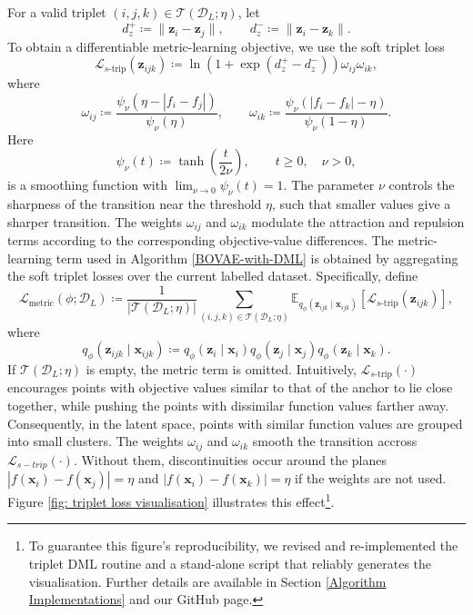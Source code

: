 \documentclass[pdflatex,sn-mathphys-num]{sn-jnl}%
\theoremstyle{thmstyleone}%
\theoremstyle{thmstyletwo}%
\theoremstyle{thmstylethree}%
\begin{document}
For a valid triplet \((i,j,k)\in\mathcal T(\mathcal D_L;\eta)\), let
\[
    d_z^+ \coloneq \|\mathbf z_i- \mathbf z_j\|,
    \qquad
    d_z^- \coloneq \|\mathbf z_i- \mathbf z_k\|.
\]
To obtain a differentiable metric-learning objective, we use the soft triplet loss
\begin{equation}\label{L_s_trip}
        \mathcal L_{s\text{-trip}}(\mathbf z_{ijk})
    \coloneq
    \ln\!\left(1+\exp(d_z^+-d_z^-)\right)\omega_{ij}\omega_{ik},
\end{equation}
where
\[
    \omega_{ij}
    \coloneq
    \frac{\psi_\nu(\eta-|f_i-f_j|)}{\psi_\nu(\eta)},
    \qquad
    \omega_{ik}
    \coloneq
    \frac{\psi_\nu(|f_i-f_k|-\eta)}{\psi_\nu(1-\eta)}.
\]
Here
\[
    \psi_\nu(t)\coloneq\tanh\!\left(\frac{t}{2\nu}\right),
    \qquad t\geq 0,\quad \nu>0,
\]
is a smoothing function with $\lim_{\nu \rightarrow 0} \psi_\nu(t) = 1$. The parameter \(\nu\) controls the sharpness of the transition near the threshold \(\eta\), such that smaller values give a sharper transition. The weights $\omega_{ij}$ and $\omega_{ik}$ modulate the attraction and repulsion terms according to the corresponding objective-value differences.
The metric-learning term used in Algorithm \ref{BOVAE-with-DML} is obtained by aggregating the soft triplet losses over the current labelled dataset. Specifically, define
\begin{equation}\label{metric_loss_avg}
    \mathcal L_{\mathrm{metric}}(\phi;\mathcal D_L)
    \coloneq
    \frac{1}{|\mathcal T(\mathcal D_L;\eta)|}
    \sum_{(i,j,k)\in\mathcal T(\mathcal D_L;\eta)}
    \mathbb E_{q_\phi(\mathbf z_{ijk}\mid \mathbf x_{ijk})}
    \left[
        \mathcal L_{s\text{-trip}}(\mathbf z_{ijk})
    \right],
\end{equation}
where
\[
    q_\phi(\mathbf z_{ijk}\mid \mathbf x_{ijk})
    \coloneq
    q_\phi(\mathbf z_i\mid \mathbf x_i)q_\phi(\mathbf z_j\mid \mathbf x_j)q_\phi(\mathbf z_k\mid \mathbf x_k).
\]
If \(\mathcal T(\mathcal D_L;\eta)\) is empty, the metric term is omitted. Intuitively, $\mathcal{L}_{s\text{-trip}}(\cdot)$ encourages points with objective values similar to that of the anchor to lie close together, while pushing the points with dissimilar function values farther away. Consequently, in the latent space, points with similar function values are grouped into small clusters. The weights $\omega_{ij}$ and $\omega_{ik}$ smooth the transition accross $\mathcal{L}_{s-trip}(\cdot)$. Without them, discontinuities occur around the planes $|f(\mathbf{x}_i) - f(\mathbf{x}_j)| = \eta$ and $|f(\mathbf{x}_i) - f(\mathbf{x}_k)| = \eta$ if the weights are not used. Figure \ref{fig: triplet loss visualisation} illustrates this effect\footnote{To guarantee this figure’s reproducibility, we revised and re-implemented the triplet DML routine and a stand-alone script that reliably generates the visualisation. Further details are available in Section \ref{Algorithm Implementations} and our GitHub page.}.
\end{document}
